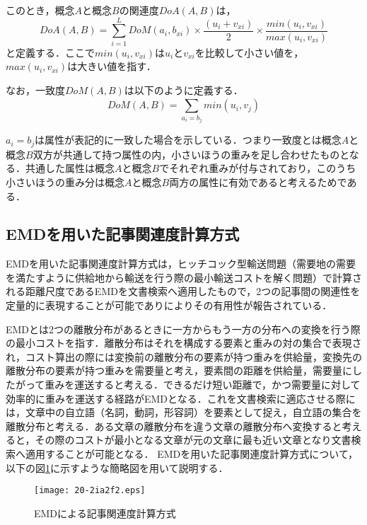 \documentclass[japanese]{jnlp_1.4}
\begin{document}
このとき，概念$A$と概念$B$の関連度$DoA(A,B)$は，
\begin{equation}
 \mathit{DoA}(A,B)=\displaystyle{\sum_{i=1}^{L}\mathit{DoM}(a_i,b_{xi})\times\frac{(u_i+v_{xi})}{2}\times\frac{\mathit{min}(u_i,v_{xi})}{\mathit{max}(u_i,v_{xi})}}
\end{equation}
と定義する．ここで$\mathit{min}(u_i,v_{xi})$は$u_i$と$v_{xi}$を比較して小さい値を，$\mathit{max}(u_i,v_{xi})$は大きい値を指す．

なお，一致度$\mathit{DoM}(A,B)$は以下のように定義する．
\begin{equation}
\mathit{DoM}(A,B)=\displaystyle{\sum_{a_i=b_j}^{}\mathit{min}(u_i,v_j)}
\end{equation}

$a_i=b_j$は属性が表記的に一致した場合を示している．つまり一致度とは概念$A$と概念$B$双方が共通して持つ属性の内，小さいほうの重みを足し合わせたものとなる．共通した属性は概念$A$と概念$B$でそれぞれ重みが付与されており，このうち小さいほうの重み分は概念$A$と概念$B$両方の属性に有効であると考えるためである．



\subsection{EMDを用いた記事関連度計算方式}
\label{EMD}

EMDを用いた記事関連度計算方式は，ヒッチコック型輸送問題\cite{Book_06}（需要地の需要を満たすように供給地から輸送を行う際の最小輸送コストを解く問題）で計算される距離尺度であるEMDを文書検索へ適用したもので，2つの記事間の関連性を定量的に表現することが可能であり\cite{Article_06}によりその有用性が報告されている．

EMDとは2つの離散分布があるときに一方からもう一方の分布への変換を行う際の最小コストを指す．離散分布はそれを構成する要素と重みの対の集合で表現され，コスト算出の際には変換前の離散分布の要素が持つ重みを供給量，変換先の離散分布の要素が持つ重みを需要量と考え，要素間の距離を供給量，需要量にしたがって重みを運送すると考える．できるだけ短い距離で，かつ需要量に対して効率的に重みを運送する経路がEMDとなる．これを文書検索に適応させる際には，文章中の自立語（名詞，動詞，形容詞）を要素として捉え，自立語の集合を離散分布と考える．ある文章の離散分布を違う文章の離散分布へ変換すると考えると，その際のコストが最小となる文章が元の文章に最も近い文章となり文書検索へ適用することが可能となる．
EMDを用いた記事関連度計算方式について，以下の図\ref{fig:EMD}に示すような簡略図を用いて説明する．

\begin{figure}[t]
 \begin{center}
  \texttt{[image: 20-2ia2f2.eps]}
 \end{center}
 \caption{EMDによる記事関連度計算方式}
 \label{fig:EMD}
\end{figure}
\end{document}
